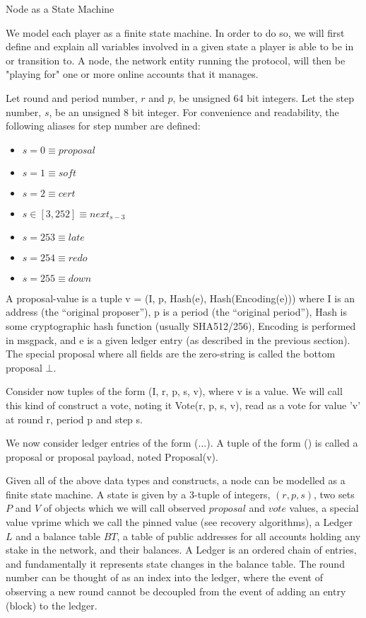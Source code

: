 \documentclass[10pt,a4paper]{article}
\begin{document}
\begin{section}{Node as a State Machine}


We model each player as a finite state machine. In order to do so, we will first
define and explain all variables involved in a given state a player is able to be in or transition to.
A node, the network entity running the protocol, will then be "playing for" one or more online accounts that it manages.

Let round and period number, $r$ and $p$, be unsigned 64 bit integers. Let the 
step number, $s$, be an unsigned  8 bit integer.
For convenience and readability, the following aliases for step number are defined:
\begin{itemize}
    \item $s=0 \equiv proposal$
    \item $s=1 \equiv soft$
    \item $s=2 \equiv cert$
    \item $s \in [3,252] \equiv next_{s-3}$
    \item $s=253 \equiv late$
    \item $s=254 \equiv redo$
    \item $s=255 \equiv down$
\end{itemize}


A proposal-value is a tuple v = (I, p, Hash(e), Hash(Encoding(e))) where I is
an address (the “original proposer”), p is a period (the “original period”),
Hash is some cryptographic hash function (usually SHA512/256), Encoding is
performed in msgpack, and e is a given ledger entry (as described in the previous section).
The special proposal where all fields are the zero-string is called the bottom proposal $\bot$.



Consider now tuples of the form (I, r, p, s, v), where v is a value.
We will call this kind of construct a vote, noting it Vote(r, p, s, v), read as
a vote for value 'v' at round r, period p and step s.

We now consider ledger entries of the form (...).
A tuple of the form () is called a proposal or proposal payload, noted Proposal(v).

Given all of the above data types and constructs, a node can be modelled as 
a finite state machine. A state is given by a 3-tuple of integers, $(r, p, s)$, 
two sets $P$ and $V$ of objects which we will call observed $proposal$ and $vote$ values, 
a special value vprime which we call the pinned value (see recovery algorithms),
a Ledger $L$ and a balance table $BT$, a table of public addresses for all 
accounts holding any stake in the network, and their balances. A Ledger is an 
ordered chain of entries, and fundamentally it represents state changes in the balance table.
The round number can be thought of as an index into the ledger, where the event of observing
a new round cannot be decoupled from the event of adding an entry (block) to the ledger.




\end{section}
\end{document}
